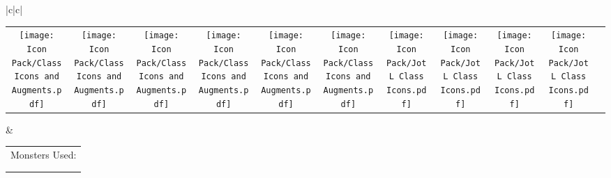 \documentclass[13ex]{article}
\begin{document}
\begin{landscape}
\begin{center}
\begin{tabular}{|c|c|}
\begin{tabular}{c c c c c c c c c c c}
                \rule{0pt}{12pt}\texttt{[image: Icon Pack/Class Icons and Augments.pdf]}\underline{\hspace{1em}} & \texttt{[image: Icon Pack/Class Icons and Augments.pdf]}\underline{\hspace{1em}} & \texttt{[image: Icon Pack/Class Icons and Augments.pdf]}\underline{\hspace{1em}} & \texttt{[image: Icon Pack/Class Icons and Augments.pdf]}\underline{\hspace{1em}} & \texttt{[image: Icon Pack/Class Icons and Augments.pdf]}\underline{\hspace{1em}} & \texttt{[image: Icon Pack/Class Icons and Augments.pdf]}\underline{\hspace{1em}} & \texttt{[image: Icon Pack/JotL Class Icons.pdf]}\underline{\hspace{1em}}         & \texttt{[image: Icon Pack/JotL Class Icons.pdf]}\underline{\hspace{1em}}         & \texttt{[image: Icon Pack/JotL Class Icons.pdf]}\underline{\hspace{1em}}         & \texttt{[image: Icon Pack/JotL Class Icons.pdf]}\underline{\hspace{1em}}          &                                                                                                         \\
            \end{tabular} & \begin{tabular}{c c c c}
                                \multicolumn{4}{c}{Monsters Used:}                                                                                        \\
                                \rule{0pt}{15pt}\underline{\hspace{8.5em}} & \underline{\hspace{8.5em}} & \underline{\hspace{8.5em}} & \underline{\hspace{8.5em}} \\
                                \rule{0pt}{15pt}\underline{\hspace{8.5em}} & \underline{\hspace{8.5em}} & \underline{\hspace{8.5em}} &                          \\

\end{tabular}
\end{tabular}
\end{center}
\end{landscape}
\end{document}
